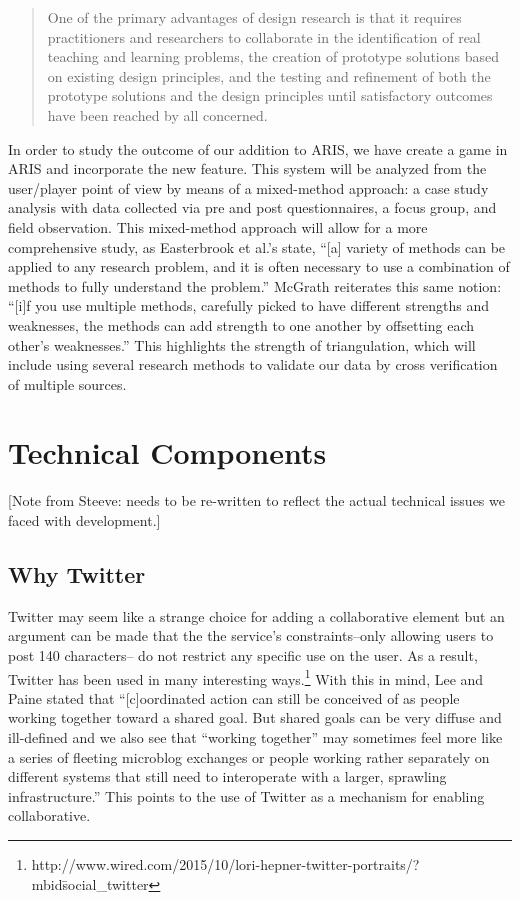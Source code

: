 \documentclass{sigchi}
\begin{document}
\blockquote{One of the primary advantages of design research is that it requires practitioners and researchers to collaborate in the identification of real teaching and learning problems, the creation of prototype solutions based on existing design principles, and the testing and refinement of both the prototype solutions and the design principles until satisfactory outcomes have been reached by all concerned.\cite{reeves2005design}}

In order to study the outcome of our addition to ARIS, we have create a game in ARIS and incorporate the new feature. This system will be analyzed from the user/player point of view by means of a mixed-method approach: a case study analysis with data collected via pre and post questionnaires, a focus group, and field observation. This mixed-method approach will allow for a more comprehensive study, as Easterbrook et al.’s state, ``[a] variety of methods can be applied to any research problem, and it is often necessary to use a combination of methods to fully understand the problem.''\cite{easterbrook2008selecting} McGrath reiterates this same notion: ``[i]f you use multiple methods, carefully picked to have different strengths and weaknesses, the methods can add strength to one another by offsetting each other’s weaknesses.''\cite{mcgrath1995methodology} This highlights the strength of triangulation, which will include using several research methods to validate our data by cross verification of multiple sources.

\section{Technical Components}
[Note from Steeve: needs to be re-written to reflect the actual technical issues we faced with development.]
\subsection{Why Twitter}
Twitter may seem like a strange choice for adding a collaborative element but an argument can be made that the the service’s constraints--only allowing users to post 140 characters-- do not restrict any specific use on the user. As a result, Twitter has been used in many interesting ways.\footnote{http://www.wired.com/2015/10/lori-hepner-twitter-portraits/?mbid\=social\_twitter} With this in mind, Lee and Paine stated that  ``[c]oordinated action can still be conceived of as people working together toward a shared goal. But shared goals can be very diffuse and ill-defined and we also see that “working together” may sometimes feel more like a series of fleeting microblog exchanges or people working rather separately on different systems that still need to interoperate with a larger, sprawling infrastructure.''\cite{lee2015matrix} This points to the use of Twitter as a mechanism for enabling collaborative.
\end{document}
